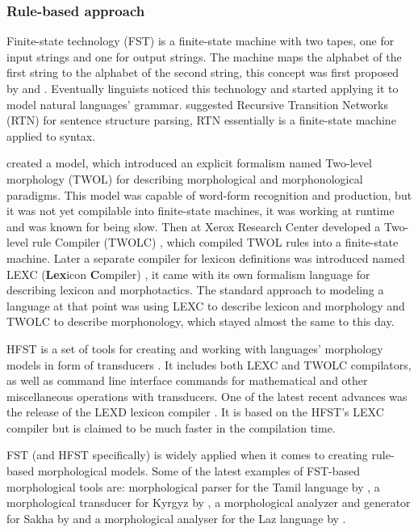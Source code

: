 \subsubsection{Rule-based approach}
\par Finite-state technology (FST) is a finite-state machine with two tapes, one for input strings and one for output strings. The machine maps the alphabet of the first string to the alphabet of the second string, this concept was first proposed by \textcite{mealy_method_1955} and \textcite{moore_gedanken_1955}. Eventually linguists noticed this technology and started applying it to model natural languages' grammar. \textcite{woods_trans_1970} suggested Recursive Transition Networks (RTN) for sentence structure parsing, RTN essentially is a finite-state machine applied to syntax. 
\par \textcite{koskenniemi_twol_1983} created a model, which introduced an explicit formalism named Two-level morphology (TWOL) for describing morphological and morphonological paradigms. This model was capable of word-form recognition and production, but it was not yet compilable into finite-state machines, it was working at runtime and was known for being slow. Then \textcite{karttunen_twolc_1987} at Xerox Research Center developed a Two-level rule Compiler (TWOLC) , which compiled TWOL rules into a finite-state machine. Later a separate compiler for lexicon definitions was introduced named LEXC (\textbf{Lex}icon \textbf{C}ompiler) \parencite{karttunen_lexc_1993}, it came with its own formalism language for describing lexicon and morphotactics. The standard approach to modeling a language at that point was using LEXC to describe lexicon and morphology and TWOLC to describe morphonology, which stayed almost the same to this day. 
\par HFST is a set of tools for creating and working with languages' morphology models in form of transducers \parencite{linden_hfst_2009}. It includes both LEXC and TWOLC compilators, as well as command line interface commands for mathematical and other miscellaneous operations with transducers. One of the latest recent advances was the release of the LEXD lexicon compiler \parencite{swanson_lexd_2021}. It is based on the HFST's LEXC compiler but is claimed to be much faster in the compilation time.
\par FST (and HFST specifically) is widely applied when it comes to creating rule-based morphological models. Some of the latest examples of FST-based morphological tools are: morphological parser for the Tamil language by \textcite{sarveswaran_morph_2021}, a morphological transducer for Kyrgyz by \textcite{washington_finite_2012}, a morphological analyzer and generator for Sakha by \textcite{ivanova_free_2022} and a morphological analyser for the Laz language by \textcite{onal_building_2019}. 